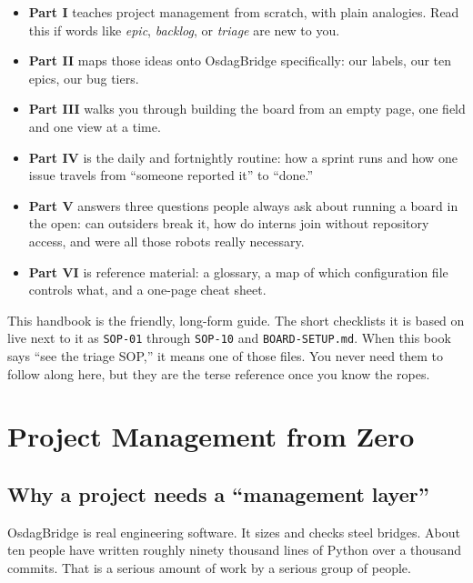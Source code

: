 \documentclass[11pt,a4paper]{report}
\newcommand{\code}[1]{\texttt{#1}}
\begin{document}
\begin{itemize}[leftmargin=1.4em,itemsep=2pt]
  \item \textbf{Part I} teaches project management from scratch, with plain
        analogies. Read this if words like \emph{epic}, \emph{backlog}, or
        \emph{triage} are new to you.
  \item \textbf{Part II} maps those ideas onto OsdagBridge specifically: our
        labels, our ten epics, our bug tiers.
  \item \textbf{Part III} walks you through building the board from an empty
        page, one field and one view at a time.
  \item \textbf{Part IV} is the daily and fortnightly routine: how a sprint runs
        and how one issue travels from ``someone reported it'' to ``done.''
  \item \textbf{Part V} answers three questions people always ask about running a
        board in the open: can outsiders break it, how do interns join without
        repository access, and were all those robots really necessary.
  \item \textbf{Part VI} is reference material: a glossary, a map of which
        configuration file controls what, and a one-page cheat sheet.
\end{itemize}

\begin{notebox}
This handbook is the friendly, long-form guide. The short checklists it is based
on live next to it as \code{SOP-01} through \code{SOP-10} and
\code{BOARD-SETUP.md}. When this book says ``see the triage SOP,'' it means one of
those files. You never need them to follow along here, but they are the terse
reference once you know the ropes.
\end{notebox}

\part{Project Management from Zero}

\chapter{Why a project needs a ``management layer''}

OsdagBridge is real engineering software. It sizes and checks steel bridges. About
ten people have written roughly ninety thousand lines of Python over a thousand
commits. That is a serious amount of work by a serious group of people.
\end{document}
